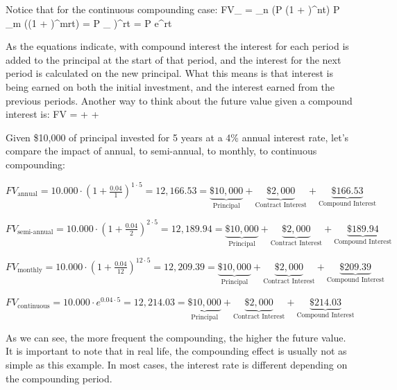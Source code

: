 Notice that for the continuous compounding case:
\bse
FV_{} = \lim_{n \to \infty} \left(P \cdot (1 + )^{nt}\right)
 P \cdot \lim_{m \to \infty} \left((1 + )^{mrt}\right)
= P \cdot {}_{} \biggl)^{rt} = P \cdot
e^{rt}
\ese

As the equations indicate, with compound interest the interest for each period is added to the principal at the start
of that period, and the interest for the next period is calculated on the new principal. What this means is that
interest is being earned on both the initial investment, and the interest earned from the previous periods. Another
way to think about the future value given a compound interest is:
\bse
FV =  +  + 
\ese

\be
Given \$10,000 of principal invested for 5 years at a 4\% annual interest rate, let's compare the impact of annual, to
semi-annual, to monthly, to continuous compounding:
\bit
\item $FV_{\text{annual}} = 10.000 \cdot \left(1 + \frac{0.04}{1}\right)^{1 \cdot 5} = 12,166.53 =
\underbrace{\$10,000}_{\text{Principal}} + \underbrace{\$2,000}_{\text{Contract Interest}} +
\underbrace{\$166.53}_{\text{Compound Interest}}$
\item $FV_{\text{semi-annual}} = 10.000 \cdot \left(1 + \frac{0.04}{2}\right)^{2 \cdot 5} = 12,189.94 =
\underbrace{\$10,000}_{\text{Principal}} + \underbrace{\$2,000}_{\text{Contract Interest}} +
\underbrace{\$189.94}_{\text{Compound Interest}}$
\item $FV_{\text{monthly}} = 10.000 \cdot \left(1 + \frac{0.04}{12}\right)^{12 \cdot 5} = 12,209.39 =
\underbrace{\$10,000}_{\text{Principal}} + \underbrace{\$2,000}_{\text{Contract Interest}} +
\underbrace{\$209.39}_{\text{Compound Interest}}$
\item $FV_{\text{continuous}} = 10.000 \cdot e^{0.04 \cdot 5} = 12,214.03 = \underbrace{\$10,000}_{\text{Principal}} +
\underbrace{\$2,000}_{\text{Contract Interest}} + \underbrace{\$214.03}_{\text{Compound Interest}}$
\eit

As we can see, the more frequent the compounding, the higher the future value. It is important to note that in real
life, the compounding effect is usually not as simple as this example. In most cases, the interest rate is different
depending on the compounding period.
\ee

